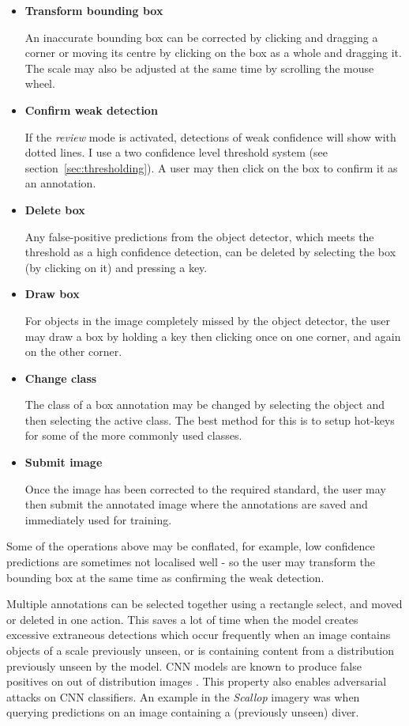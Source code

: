 \begin{itemize}
    \item {\bf Transform bounding box}\par
An inaccurate bounding box can be corrected by clicking and dragging a corner or moving its centre by clicking on the box as a whole and dragging it. The scale may also be adjusted at the same time by scrolling the mouse wheel.
    \item {\bf Confirm weak detection}\par
If the \emph{review} mode is activated, detections of weak confidence will show with dotted lines. I use a two confidence level threshold system (see section~\ref{sec:thresholding}). A user may then click on the box to confirm it as an annotation.
    \item {\bf Delete box}\par
Any false-positive predictions from the object detector, which meets the threshold as a high confidence detection, can be deleted by selecting the box (by clicking on it) and pressing a key. 
    \item {\bf Draw box}\par
For objects in the image completely missed by the object detector, the user may draw a box by holding a key then clicking once on one corner, and again on the other corner.
    \item {\bf Change class}\par
The class of a box annotation may be changed by selecting the object and then selecting the active class. The best method for this is to setup hot-keys for some of the more commonly used classes.
    \item {\bf Submit image}\par
Once the image has been corrected to the required standard, the user may then submit the annotated image where the annotations are saved and immediately used for training.
\end{itemize}

Some of the operations above may be conflated, for example, low confidence predictions are sometimes not localised well - so the user may transform the bounding box at the same time as confirming the weak detection.


Multiple annotations can be selected together using a rectangle select, and moved or deleted in one action.  This saves a lot of time when the model creates excessive extraneous detections which occur frequently when an image contains objects of a scale previously unseen, or is containing content from a distribution previously unseen by the model. \gls{CNN} models are known to produce false positives on out of distribution images \cite{Hendrycks2016,Lee2018}. This property also enables adversarial attacks on \gls{CNN} classifiers. An example in the \emph{Scallop} imagery was when querying predictions on an image containing a (previously unseen) diver.



